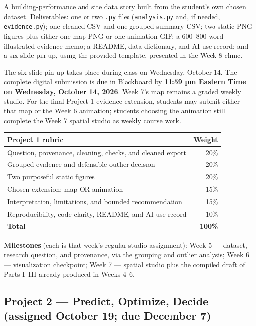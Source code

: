 \documentclass[11pt]{article}
\begin{document}
A building-performance and site data story built from the student's own chosen dataset.
Deliverables: one or two \texttt{.py} files (\texttt{analysis.py} and, if needed,
\texttt{evidence.py}); one cleaned CSV and one grouped-summary CSV; two static PNG figures
plus either one map PNG or one animation GIF; a 600--800-word illustrated evidence memo; a
README, data dictionary, and AI-use record; and a six-slide pin-up, using the provided
template, presented in the Week 8 clinic.

The six-slide pin-up takes place during class on Wednesday, October 14. The complete digital
submission is due in Blackboard by \textbf{11:59 pm Eastern Time on Wednesday, October 14,
2026}. Week 7's map remains a graded weekly studio. For the final Project 1 evidence
extension, students may submit either that map or the Week 6 animation; students choosing the
animation still complete the Week 7 spatial studio as weekly course work.

\begin{center}
\begin{tabular}{@{}lr@{}}
\toprule
\textbf{Project 1 rubric} & \textbf{Weight} \\
\midrule
Question, provenance, cleaning, checks, and cleaned export & 20\% \\
Grouped evidence and defensible outlier decision           & 20\% \\
Two purposeful static figures                              & 20\% \\
Chosen extension: map OR animation                         & 15\% \\
Interpretation, limitations, and bounded recommendation     & 15\% \\
Reproducibility, code clarity, README, and AI-use record    & 10\% \\
\midrule
\textbf{Total} & \textbf{100\%} \\
\bottomrule
\end{tabular}
\end{center}

\textbf{Milestones} (each is that week's regular studio assignment): Week 5 --- dataset,
research question, and provenance, via the grouping and outlier analysis; Week 6 ---
visualization checkpoint; Week 7 --- spatial studio plus the compiled draft of Parts I--III
already produced in Weeks 4--6.

\subsection{Project 2 --- Predict, Optimize, Decide (assigned October 19; due December 7)}
\end{document}
